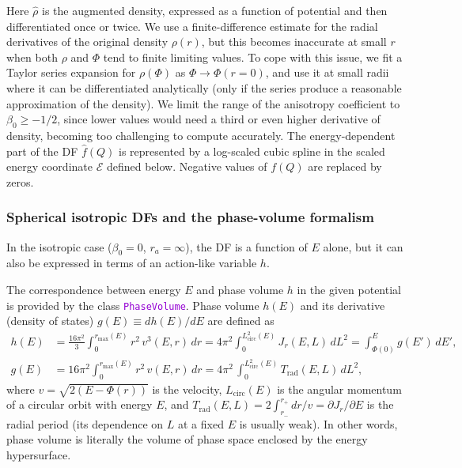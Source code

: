 \documentclass[12pt]{article}
\newcommand{\ttt}[1]{\textcolor{darkviolet}{\texttt{#1}}}
\renewcommand{\d}{\partial}
\newcommand{\scE}{\mathscr E}
\begin{document}
Here $\hat\rho$ is the augmented density, expressed as a function of potential and then differentiated once or twice.
We use a finite-difference estimate for the radial derivatives of the original density $\rho(r)$, but this becomes inaccurate at small $r$ when both $\rho$ and $\Phi$ tend to finite limiting values. To cope with this issue, we fit a Taylor series expansion for $\rho(\Phi)$ as $\Phi \to \Phi(r=0)$, and use it at small radii where it can be differentiated analytically (only if the series produce a reasonable approximation of the density). We limit the range of the anisotropy coefficient to $\beta_0 \ge -1/2$, since lower values would need a third or even higher derivative of density, becoming too challenging to compute accurately.
The energy-dependent part of the DF $\hat f(Q)$ is represented by a log-scaled cubic spline in the scaled energy coordinate $\scE$ defined below. Negative values of $f(Q)$ are replaced by zeros.

\subsubsection{Spherical isotropic DFs and the phase-volume formalism}  \label{sec:DFsphericalIsotropicDetails}

In the isotropic case ($\beta_0=0$, $r_a=\infty$), the DF is a function of $E$ alone, but it can also be expressed in terms of an action-like variable $h$.

The correspondence between energy $E$ and phase volume $h$ in the given potential is provided by the class \ttt{PhaseVolume}. Phase volume $h(E)$ and its derivative (density of states) $g(E)\equiv dh(E)/dE$ are defined as
\begin{subequations}
\begin{align}
h(E) &= \frac{16\pi^2}3 \int_0^{r_\mathrm{max}(E)} r^2\, v^3(E,r)\, dr =
  4\pi^2\int_0^{L^2_\mathrm{circ}(E)} J_r(E,L)\,dL^2 =
  \int_{\Phi(0)}^E g(E')\, dE' ,\\
g(E) &= 16\pi^2 \int_0^{r_\mathrm{max}(E)} r^2\, v(E,r)\, dr =
  4\pi^2\, \int_0^{L_\mathrm{circ}^2(E)} T_\mathrm{rad}(E,L)\,dL^2,
\end{align}
\end{subequations}
where  $v = \sqrt{2(E-\Phi(r))}$ is the velocity,  $L_\mathrm{circ}(E)$ is the angular momentum of a circular orbit with energy $E$,  and  $T_\mathrm{rad}(E,L) = 2 \int_{r_-}^{r_+} dr/v = \d J_r/\d E$  is the radial period (its dependence on $L$ at a fixed $E$ is usually weak).
In other words, phase volume is literally the volume of phase space enclosed by the energy hypersurface.
\end{document}
